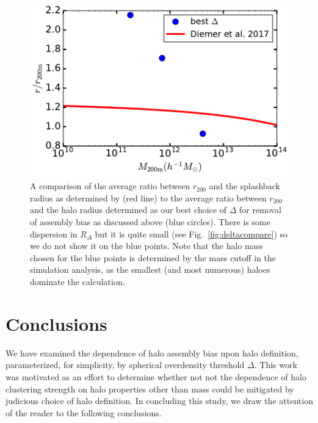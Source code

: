 \documentclass[usenatbib,fleqn]{mnras}
\begin{document}
\begin{figure}
	\centering
	\includegraphics[width=\columnwidth]{test_splashback.pdf}
	\caption{A comparison of the average ratio between $r_{200}$ and the splashback radius as determined by \citet{diemer_etal17} (red line) to the average ratio between $r_{200}$ and the halo radius determined as our best choice of $\Delta$ for removal of assembly bias as discussed above (blue circles). There is some dispersion in $R_{\Delta}$ but it is quite small (see Fig.~\ref{fig:deltacompare}) so we do not show it on the blue points. Note that the halo mass chosen for the blue points is determined by the mass cutoff in the simulation analysis, as the smallest (and most numerous) haloes dominate the calculation. 
}
	\label{fig:splashback_compare}
\end{figure}

\section[]{Conclusions}
\label{section:conclusions}

We have examined the dependence of halo assembly bias upon halo definition, parameterized, for simplicity, by spherical overdensity threshold $\Delta$. This work was motivated as an effort to determine whether not not the dependence of halo clustering strength on halo properties other than mass 
could be mitigated by judicious choice of halo definition. In concluding this study, we draw the attention of the reader to the following conclusions.
\end{document}
